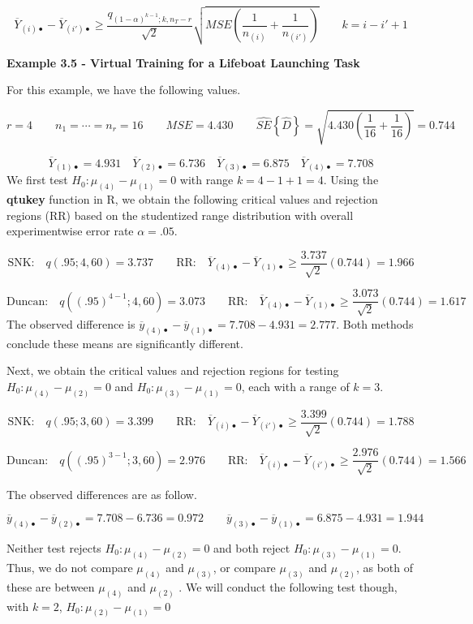 \documentclass[
]{book}
\begin{document}
\[
\overline{Y}_{(i)\bullet}- \overline{Y}_{(i')\bullet} \ge
\frac{q_{(1-\alpha)^{k-1};k,n_T-r}}{\sqrt{2}}
\sqrt{MSE\left(\frac{1}{n_{(i)}}+\frac{1}{n_{(i')}}\right)} \qquad k=i-i'+1
\]

\textbf{Example 3.5 - Virtual Training for a Lifeboat Launching Task}

For this example, we have the following values.

\[
r=4 \qquad n_1=\cdots=n_r=16 \qquad MSE=4.430 \qquad \hat{SE}\left\{\hat{D}\right\}=
\sqrt{4.430\left(\frac{1}{16}+\frac{1}{16}\right)}=0.744
\]

\[
\overline{Y}_{(1)\bullet}=4.931 \quad
\overline{Y}_{(2)\bullet}=6.736 \quad
\overline{Y}_{(3)\bullet}=6.875 \quad
\overline{Y}_{(4)\bullet}=7.708 
\] We first test \(H_0:\mu_{(4)}-\mu_{(1)}=0\) with range \(k=4-1+1=4\).
Using the \textbf{qtukey} function in R, we obtain the following
critical values and rejection regions (RR) based on the studentized
range distribution with overall experimentwise error rate
\(\alpha=.05\).

\[
\mbox{SNK:} \quad q(.95;4,60)=3.737   \qquad \mbox{RR:} \quad
\overline{Y}_{(4)\bullet}- \overline{Y}_{(1)\bullet} \ge
\frac{3.737}{\sqrt{2}}(0.744)=1.966
\]

\[
\mbox{Duncan:} \quad q((.95)^{4-1};4,60)=3.073   \qquad \mbox{RR:} \quad
\overline{Y}_{(4)\bullet}- \overline{Y}_{(1)\bullet} \ge
\frac{3.073}{\sqrt{2}}(0.744)=1.617
\] The observed difference is
\(\overline{y}_{(4)\bullet}- \overline{y}_{(1)\bullet}=7.708-4.931=2.777\).
Both methods conclude these means are significantly different.

Next, we obtain the critical values and rejection regions for testing
\(H_0:\mu_{(4)}-\mu_{(2)}=0\) and \(H_0:\mu_{(3)}-\mu_{(1)}=0\), each
with a range of \(k=3\).

\[
\mbox{SNK:} \quad q(.95;3,60)=3.399   \qquad \mbox{RR:} \quad
\overline{Y}_{(i)\bullet}- \overline{Y}_{(i')\bullet} \ge
\frac{3.399}{\sqrt{2}}(0.744)=1.788
\]

\[
\mbox{Duncan:} \quad q((.95)^{3-1};3,60)=2.976   \qquad \mbox{RR:} \quad
\overline{Y}_{(i)\bullet}- \overline{Y}_{(i')\bullet} \ge
\frac{2.976}{\sqrt{2}}(0.744)=1.566
\]

The observed differences are as follow.

\[
\overline{y}_{(4)\bullet}- \overline{y}_{(2)\bullet}=7.708-6.736=0.972 \qquad
\overline{y}_{(3)\bullet}- \overline{y}_{(1)\bullet}=6.875-4.931=1.944
\]

Neither test rejects \(H_0:\mu_{(4)}-\mu_{(2)}=0\) and both reject
\(H_0:\mu_{(3)}-\mu_{(1)}=0\). Thus, we do not compare \(\mu_{(4)}\) and
\(\mu_{(3)}\), or compare \(\mu_{(3)}\) and \(\mu_{(2)}\), as both of
these are between \(\mu_{(4)}\) and \(\mu_{(2)}\) . We will conduct the
following test though, with \(k=2\), \(H_0:\mu_{(2)}-\mu_{(1)}=0\)
\end{document}
